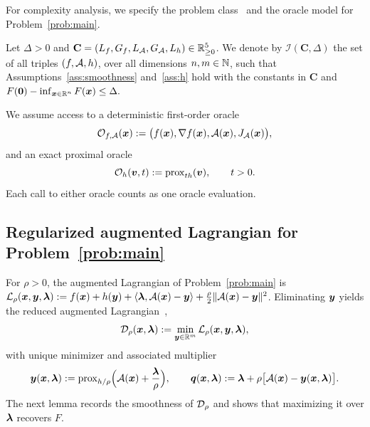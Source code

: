 For complexity analysis, we specify the problem class~\cite{carmon2020lower,nemirovski1983problem}
and the oracle model for Problem~\eqref{prob:main}.
\begin{definition}
\label{def:problem-class}
Let \(\Delta>0\) and
\(\mathbf C=(L_f,G_f,L_{\mathcal{A}},G_{\mathcal{A}},L_h)\in\mathbb{R}^5_{\ge0}\).
We denote by \(\mathcal I(\mathbf C,\Delta)\) the set of all triples
\((f,\mathcal{A},h)\), over all dimensions \(n,m\in\mathbb{N}\), such that
Assumptions~\ref{ass:smoothness} and~\ref{ass:h} hold with the constants
in \(\mathbf C\) and
\(
    F(\bm{0})-\inf_{\bm{x}\in\mathbb{R}^n}F(\bm{x})\le\Delta .
\)
\end{definition}

\begin{definition}
\label{def:oracle-model}
We assume access to a deterministic first-order oracle
\[
    \mathcal{O}_{f,\mathcal{A}}(\bm{x})
    :=
    \bigl(f(\bm{x}),\nabla f(\bm{x}),\mathcal{A}(\bm{x}),J_{\mathcal{A}}(\bm{x})\bigr),
\]
and an exact proximal oracle
\[
    \mathcal{O}_{h}(\bm{v},t)
    :=
    \operatorname{prox}_{t h}(\bm{v}),
    \qquad t>0.
\]
Each call to either oracle counts as one oracle evaluation.
\end{definition}

\subsection{\texorpdfstring{Regularized augmented Lagrangian for Problem~\eqref{prob:main}}{Regularized augmented Lagrangian for Problem (P)}}
\label{subsec:regularized-al}
For \(\rho>0\), the augmented Lagrangian of Problem~\eqref{prob:main} is
\(\mathcal{L}_\rho(\bm{x},\bm{y},\bm{\lambda}):=f(\bm{x})+h(\bm{y})+\langle\bm{\lambda},\mathcal{A}(\bm{x})-\bm{y}\rangle+\frac{\rho}{2}\|\mathcal{A}(\bm{x})-\bm{y}\|^2\).
Eliminating \(\bm{y}\) yields the reduced augmented
Lagrangian~\cite{rockafellar1976augmented}, 
\begin{equation}
    \mathcal{D}_\rho(\bm{x},\bm{\lambda})
    :=\min_{\bm{y}\in\mathbb{R}^m}\mathcal{L}_\rho(\bm{x},\bm{y},\bm{\lambda}),
    \label{eq:reduced-al}
\end{equation}
with unique minimizer and associated multiplier
\begin{equation}
    \bm{y}(\bm{x},\bm{\lambda}):=\mathrm{prox}_{h/\rho}\Bigl(\mathcal{A}(\bm{x})+\frac{\bm{\lambda}}{\rho}\Bigr),
    \qquad
    \bm{q}(\bm{x},\bm{\lambda}):=\bm{\lambda}+\rho\bigl[\mathcal{A}(\bm{x})-\bm{y}(\bm{x},\bm{\lambda})\bigr].
    \label{eq:prox-multiplier}
\end{equation}
The next lemma records the smoothness of \(\mathcal{D}_\rho\) and shows that
maximizing it over \(\bm{\lambda}\) recovers \(F\).

